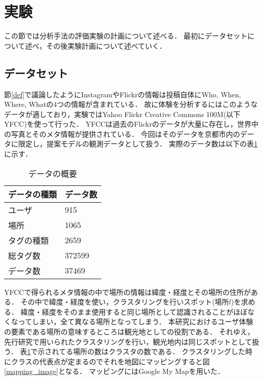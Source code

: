 \documentclass[a4j,10pt, twocolumn]{jarticle}
\begin{document}
\section{実験} \label{experiment}
この節では分析手法の評価実験の計画について述べる．
最初にデータセットについて述べ，その後実験計画について述べていく．

\subsection{データセット} \label{dataset}
節\ref{def}で議論したようにInstagramやFlickrの情報は投稿自体にWho, When, Where, Whatの4つの情報が含まれている．
故に体験を分析するにはこのようなデータが適しており，実験ではYahoo Flickr Creative Commons 100M(以下YFCC)\cite{thomee2016yfcc100m}を使って行った．
YFCCは過去のFlickrのデータが大量に存在し，世界中の写真とそのメタ情報が提供されている．
今回はそのデータを京都市内のデータに限定し，提案モデルの観測データとして扱う．
実際のデータ数は以下の表\ref{dataset-table}に示す．

\begin{table}[tb]
  \begin{center}
    \caption{データの概要}
    \label{dataset-table}
    \begin{tabular}{ p{5cm} p{1.5cm} } \hline \hline
      データの種類 & データ数 \\  \hline
      ユーザ & 915 \\
      場所 & 1065 \\
      タグの種類 & 2659 \\
      総タグ数 & 372599 \\ \hline
      データ数 & 37469 \\ \hline \hline
    \end{tabular}
  \end{center}
\end{table}

YFCCで得られるメタ情報の中で場所の情報は緯度・経度とその場所の住所がある．
その中で緯度・経度を使い，クラスタリングを行いスポット(場所$l$)を求める．
緯度・経度をそのまま使用すると同じ場所として認識されることがほぼなくなってしまい，全て異なる場所となってしまう．
本研究におけるユーザ体験の要素である場所の意味するところは観光地としての役割である．
それゆえ，先行研究\cite{sun2020dexa}で用いられたクラスタリングを行い，観光地内は同じスポットとして扱う．
表\ref{dataset-table}で示されてる場所の数はクラスタの数である．
クラスタリングした時にクラスの代表点が定まるのでそれを地図にマッピングすると図\ref{mapping_image}となる．
マッピングにはGoogle My Mapを用いた．
\end{document}
